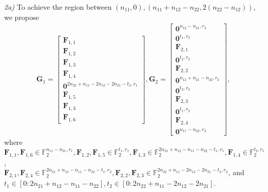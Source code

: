 \documentclass[12pt, draftclsnofoot, onecolumn]{IEEEtran}
\theoremstyle{definition}
\begin{document}
\emph{2a)} To achieve the region between $(n_{11},0),(n_{11}+n_{12} - n_{22},2(n_{22}-n_{12}))$, we propose
\begin{align}\label{eq:weak1_2a_E}
\boldsymbol{G}_1=
\begin{bmatrix}
\boldsymbol{F}_{1,1}\\
\boldsymbol{F}_{1,2} \\
\boldsymbol{F}_{1,3}\\
\boldsymbol{F}_{1,4}\\
\boldsymbol{0}^{2n_{22}+n_{11}-2n_{12}-2n_{21}-t_2 ,r_1}\\
\boldsymbol{F}_{1,5} \\
\boldsymbol{F}_{1,3} \\
\boldsymbol{F}_{1,6}
\end{bmatrix},
\boldsymbol{G}_2= \begin{bmatrix}
\boldsymbol{0}^{n_{12}-n_{21},r_2} \\
\boldsymbol{0}^{t_1,r_2} \\
\boldsymbol{F}_{2,1} \\
\boldsymbol{0}^{t_2,r_2} \\
\boldsymbol{F}_{2,2} \\
\boldsymbol{0}^{n_{12}+n_{21}-n_{22},r_2}\\
\boldsymbol{0}^{t_2,r_2} \\
\boldsymbol{F}_{2,3} \\
\boldsymbol{0}^{t_1,r_2} \\
\boldsymbol{F}_{2,4} \\
\boldsymbol{0}^{n_{11}-n_{22},r_2}
\end{bmatrix},
\end{align}
where $\boldsymbol{F}_{1,1},\boldsymbol{F}_{1,6}\in \mathbb{F}_2^{n_{11}-n_{21},r_1},\boldsymbol{F}_{1,2},\boldsymbol{F}_{1,5}\in \mathbb{F}_2^{t_1 ,r_1},\boldsymbol{F}_{1,3}\in \mathbb{F}_2^{2n_{21}+n_{12}-n_{11}-n_{22}-t_1,r_1},\boldsymbol{F}_{1,4}\in \mathbb{F}_2^{t_2 ,r_1}$, \\$\boldsymbol{F}_{2,1},\boldsymbol{F}_{2,4}\in \mathbb{F}_2^{2n_{21}+n_{12}-n_{11}-n_{22}-t_1,r_2},\boldsymbol{F}_{2,2},\boldsymbol{F}_{2,3}\in \mathbb{F}_2^{2n_{22}+n_{11}-2n_{12}-2n_{21}-t_2 ,r_2}$, and $t_1\in [0:2n_{21}+n_{12}-n_{11}-n_{22}],t_2\in[0:2n_{22}+n_{11}-2n_{12}-2n_{21}]$.
\end{document}
